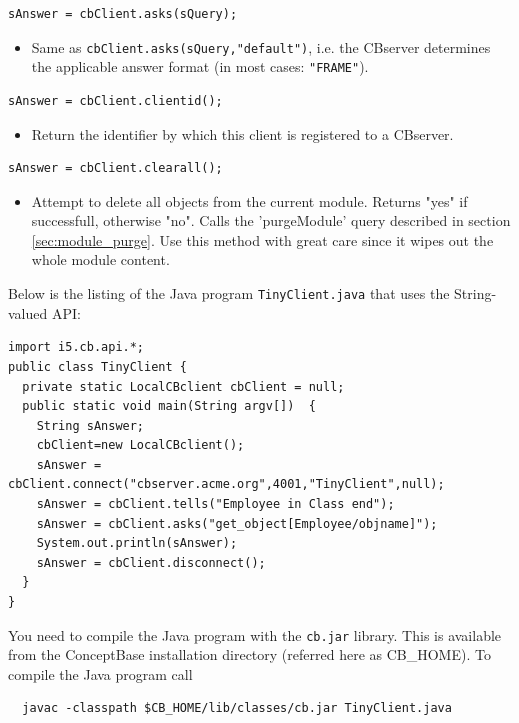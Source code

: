 \begin{verbatim}
sAnswer = cbClient.asks(sQuery);
\end{verbatim}
\begin{itemize}
\item Same as {\tt cbClient.asks(sQuery,"default")}, i.e. the CBserver determines the
applicable answer format (in most cases: {\tt "FRAME"}).
\end{itemize}

\begin{verbatim}
sAnswer = cbClient.clientid();
\end{verbatim}
\begin{itemize}
\item Return the identifier by which this client is registered to a CBserver.
\end{itemize}

\begin{verbatim}
sAnswer = cbClient.clearall();
\end{verbatim}
\begin{itemize}
\item Attempt to delete all objects from the current module. Returns "yes" if
successfull, otherwise "no". Calls the 'purgeModule' query described in section
\ref{sec:module_purge}. Use this method with great care since it wipes out
the whole module content.
\end{itemize}



\vspace{0.5cm}
Below is the listing of the Java program {\tt TinyClient.java} that uses the 
String-valued API:

{\small
\begin{verbatim}
import i5.cb.api.*;
public class TinyClient {
  private static LocalCBclient cbClient = null;
  public static void main(String argv[])  {
    String sAnswer;
    cbClient=new LocalCBclient();
    sAnswer = cbClient.connect("cbserver.acme.org",4001,"TinyClient",null);
    sAnswer = cbClient.tells("Employee in Class end");
    sAnswer = cbClient.asks("get_object[Employee/objname]");
    System.out.println(sAnswer);
    sAnswer = cbClient.disconnect();
  }
}
\end{verbatim}
}

You need to compile the Java program with the {\tt cb.jar} library. This is available 
from the ConceptBase installation directory (referred here as CB\_HOME). To compile the Java
program call

\begin{verbatim}
  javac -classpath $CB_HOME/lib/classes/cb.jar TinyClient.java
\end{verbatim}

